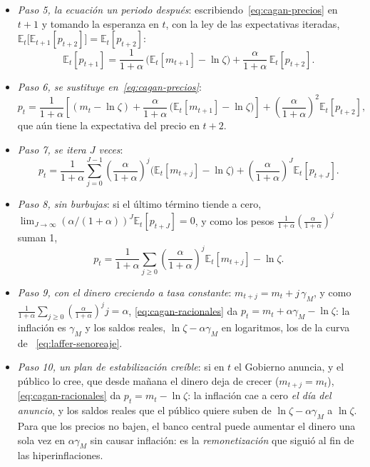 \documentclass[11pt]{article}
\begin{document}
\begin{itemize}
\item \emph{Paso 5, la ecuación un periodo después}: escribiendo~\eqref{eq:cagan-precios} en $t+1$ y tomando la esperanza en $t$, con la ley de las expectativas iteradas, $\mathbb{E}_t\big[\mathbb{E}_{t+1}[p_{t+2}]\big]=\mathbb{E}_t[p_{t+2}]$:
  \begin{equation*}
  \mathbb{E}_t[p_{t+1}]=\frac{1}{1+\alpha}\,\big(\mathbb{E}_t[m_{t+1}]-\ln\zeta\big)+\frac{\alpha}{1+\alpha}\,\mathbb{E}_t[p_{t+2}].
  \end{equation*}
\item \emph{Paso 6, se sustituye en~\eqref{eq:cagan-precios}}:
  \begin{equation*}
  p_t=\frac{1}{1+\alpha}\left[(m_t-\ln\zeta)+\frac{\alpha}{1+\alpha}\,\big(\mathbb{E}_t[m_{t+1}]-\ln\zeta\big)\right]+\left(\frac{\alpha}{1+\alpha}\right)^{2}\mathbb{E}_t[p_{t+2}],
  \end{equation*}
  que aún tiene la expectativa del precio en $t+2$.
\item \emph{Paso 7, se itera $J$ veces}:
  \begin{equation*}
  p_t=\frac{1}{1+\alpha}\sum_{j=0}^{J-1}\left(\frac{\alpha}{1+\alpha}\right)^{j}\big(\mathbb{E}_t[m_{t+j}]-\ln\zeta\big)+\left(\frac{\alpha}{1+\alpha}\right)^{J}\mathbb{E}_t[p_{t+J}].
  \end{equation*}
\item \emph{Paso 8, sin burbujas}: si el último término tiende a cero, $\lim_{J\to\infty}\left(\alpha/(1+\alpha)\right)^J\mathbb{E}_t[p_{t+J}]=0$, y como los pesos $\frac{1}{1+\alpha}\left(\frac{\alpha}{1+\alpha}\right)^j$ suman 1,
  \begin{equation}\label{eq:cagan-racionales}
  p_t=\frac{1}{1+\alpha}\sum_{j\geq0}\left(\frac{\alpha}{1+\alpha}\right)^{j}\mathbb{E}_t[m_{t+j}]-\ln\zeta .
  \end{equation}
\item \emph{Paso 9, con el dinero creciendo a tasa constante}: $m_{t+j}=m_t+j\,\gamma_M$, y como $\frac{1}{1+\alpha}\sum_{j\geq0}\left(\frac{\alpha}{1+\alpha}\right)^j j=\alpha$, \eqref{eq:cagan-racionales} da $p_t=m_t+\alpha\gamma_M-\ln\zeta$: la inflación es $\gamma_M$ y los saldos reales, $\ln\zeta-\alpha\gamma_M$ en logaritmos, los de la curva de ~\eqref{eq:laffer-senoreaje}.
\item \emph{Paso 10, un plan de estabilización creíble}: si en $t$ el Gobierno anuncia, y el público lo cree, que desde mañana el dinero deja de crecer ($m_{t+j}=m_t$), \eqref{eq:cagan-racionales} da $p_t=m_t-\ln\zeta$: la inflación cae a cero \emph{el día del anuncio}, y los saldos reales que el público quiere suben de $\ln\zeta-\alpha\gamma_M$ a $\ln\zeta$. Para que los precios no bajen, el banco central puede aumentar el dinero una sola vez en $\alpha\gamma_M$ sin causar inflación: es la \emph{remonetización} que siguió al fin de las hiperinflaciones.

\end{itemize}
\end{document}
